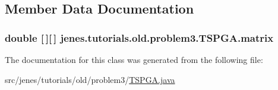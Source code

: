 \subsection{Member Data Documentation}
\hypertarget{classjenes_1_1tutorials_1_1old_1_1problem3_1_1_t_s_p_g_a_a1613f59b74e07f37759305abfd0d26b0}{
\subsubsection[{matrix}]{\setlength{\rightskip}{0pt plus 5cm}double \mbox{[}$\,$\mbox{]}\mbox{[}$\,$\mbox{]} jenes.\-tutorials.\-old.\-problem3.\-T\-S\-P\-G\-A.\-matrix\hspace{0.3cm}{\ttfamily [private]}}}\label{classjenes_1_1tutorials_1_1old_1_1problem3_1_1_t_s_p_g_a_a1613f59b74e07f37759305abfd0d26b0}


The documentation for this class was generated from the following file\-:\begin{DoxyCompactItemize}
\item 
src/jenes/tutorials/old/problem3/\hyperlink{tutorials_2old_2problem3_2_t_s_p_g_a_8java}{T\-S\-P\-G\-A.\-java}\end{DoxyCompactItemize}
